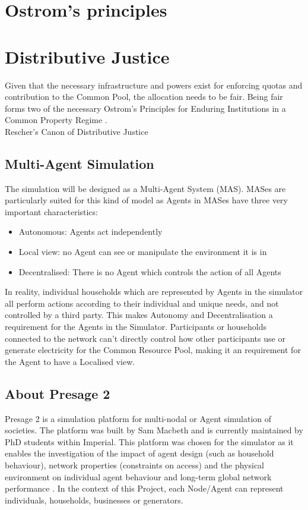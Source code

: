 \section*{Ostrom's principles}

\section*{Distributive Justice}
Given that the necessary infrastructure and powers exist for enforcing quotas and contribution to the Common Pool, the allocation needs to be fair. Being fair forms two of the necessary Ostrom's Principles for Enduring Institutions in a Common Property Regime \cite{Ostrom:90}. \\

Rescher's Canon of Distributive Justice

\subsection*{Multi-Agent Simulation}
The simulation will be designed as a Multi-Agent System (MAS). MASes are particularly suited for this kind of model as Agents in MASes have three very important characteristics:
\begin{itemize}
	\item Autonomous: Agents act independently
	\item Local view: no Agent can see or manipulate the environment it is in
	\item Decentralised: There is no Agent which controls the action of all Agents
\end{itemize}
In reality, individual households which are represented by Agents in the simulator all perform actions according to their individual and unique needs, and not controlled by a third party. This makes Autonomy and Decentralisation a requirement for the Agents in the Simulator. Participants or households connected to the network can't directly control how other participants use or generate electricity for the Common Resource Pool, making it an requirement for the Agent to have a Localised view. 

\subsection*{About Presage 2}
Presage 2 is a simulation platform for multi-nodal or Agent simulation of societies. The platform was built by Sam Macbeth and is currently maintained by PhD students within Imperial. This platform was chosen for the simulator as it enables the investigation of the impact of agent design (such as household behaviour), network properties (constraints on access) and the physical environment on individual agent behaviour and long-term global network performance \cite{Presage2-Desc:2015}. In the context of this Project, each Node/Agent can represent individuals, households, businesses or generators. 

